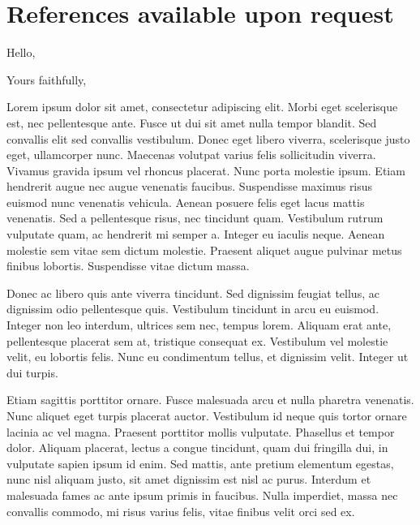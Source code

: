 \documentclass[11pt,a4paper,sans]{moderncv}
\begin{document}
\section{References available upon request}

\clearpage


\date{\today}
\opening{Hello,}
\closing{Yours faithfully,}
\makelettertitle


Lorem ipsum dolor sit amet, consectetur adipiscing elit. Morbi eget scelerisque
est, nec pellentesque ante. Fusce ut dui sit amet nulla tempor blandit. Sed
convallis elit sed convallis vestibulum. Donec eget libero viverra, scelerisque
justo eget, ullamcorper nunc. Maecenas volutpat varius felis sollicitudin
viverra. Vivamus gravida ipsum vel rhoncus placerat. Nunc porta molestie ipsum.
Etiam hendrerit augue nec augue venenatis faucibus. Suspendisse maximus risus
euismod nunc venenatis vehicula. Aenean posuere felis eget lacus mattis
venenatis. Sed a pellentesque risus, nec tincidunt quam. Vestibulum rutrum
vulputate quam, ac hendrerit mi semper a. Integer eu iaculis neque. Aenean
molestie sem vitae sem dictum molestie. Praesent aliquet augue pulvinar metus
finibus lobortis. Suspendisse vitae dictum massa.

Donec ac libero quis ante viverra tincidunt. Sed dignissim feugiat tellus, ac
dignissim odio pellentesque quis. Vestibulum tincidunt in arcu eu euismod.
Integer non leo interdum, ultrices sem nec, tempus lorem. Aliquam erat ante,
pellentesque placerat sem at, tristique consequat ex. Vestibulum vel molestie
velit, eu lobortis felis. Nunc eu condimentum tellus, et dignissim velit.
Integer ut dui turpis.

Etiam sagittis porttitor ornare. Fusce malesuada arcu et nulla pharetra
venenatis. Nunc aliquet eget turpis placerat auctor. Vestibulum id neque quis
tortor ornare lacinia ac vel magna. Praesent porttitor mollis vulputate.
Phasellus et tempor dolor. Aliquam placerat, lectus a congue tincidunt, quam dui
fringilla dui, in vulputate sapien ipsum id enim. Sed mattis, ante pretium
elementum egestas, nunc nisl aliquam justo, sit amet dignissim est nisl ac
purus. Interdum et malesuada fames ac ante ipsum primis in faucibus. Nulla
imperdiet, massa nec convallis commodo, mi risus varius felis, vitae finibus
velit orci sed ex.

\makeletterclosing
\end{document}
